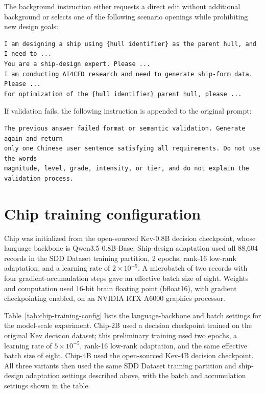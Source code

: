 \documentclass[a4paper,fleqn]{cas-dc}
\begin{document}
The background instruction either requests a direct edit without additional
background or selects one of the following scenario openings while prohibiting new
design goals:
\begin{verbatim}
I am designing a ship using {hull identifier} as the parent hull, and I need to ...
You are a ship-design expert. Please ...
I am conducting AI4CFD research and need to generate ship-form data. Please ...
For optimization of the {hull identifier} parent hull, please ...
\end{verbatim}

If validation fails, the following instruction is appended to the original prompt:
\begin{verbatim}
The previous answer failed format or semantic validation. Generate again and return
only one Chinese user sentence satisfying all requirements. Do not use the words
magnitude, level, grade, intensity, or tier, and do not explain the validation process.
\end{verbatim}

\clearpage
\section{Chip training configuration}
\label{app:training}

Chip was initialized from the open-sourced Kev-0.8B decision checkpoint, whose
language backbone is Qwen3.5-0.8B-Base. Ship-design adaptation used all 88,604
records in the SDD Dataset training partition, 2 epochs, rank-16 low-rank
adaptation, and a learning rate of $2\times10^{-5}$. A microbatch of two records
with four gradient-accumulation steps gave an effective batch size of eight.
Weights and computation used 16-bit brain floating point (bfloat16), with gradient
checkpointing enabled, on an NVIDIA RTX A6000 graphics processor.

Table~\ref{tab:chip-training-config} lists the language-backbone and batch
settings for the model-scale experiment. Chip-2B used a decision checkpoint trained on the
original Kev decision dataset; this preliminary training used two epochs, a
learning rate of $5\times10^{-5}$, rank-16 low-rank adaptation, and the same
effective batch size of eight. Chip-4B used the open-sourced Kev-4B decision checkpoint.
All three variants then used the same SDD Dataset training partition and
ship-design adaptation settings described above, with the batch and accumulation
settings shown in the table.
\end{document}
